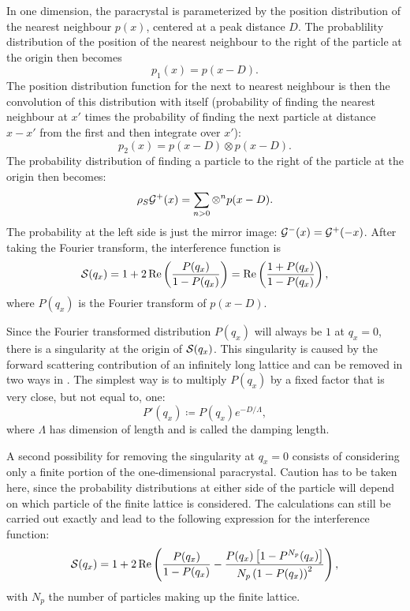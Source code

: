 In one dimension, the paracrystal is parameterized by the
position distribution of the nearest neighbour $p(x)$, centered at a peak distance $D$. The probablility
distribution of the position of the nearest neighbour to the right of the particle at the origin then becomes
\begin{equation}
  p_1(x) = p(x-D).
\end{equation}
The position distribution function for the next to nearest neighbour is then the convolution of this distribution with itself
(probability of finding the nearest neighbour at $x'$ times the probability of finding the next particle at distance $x-x'$ from the first and
then integrate over $x'$):
\begin{equation}
  p_2(x) = p(x-D) \otimes p(x-D).
\end{equation}
The probability distribution of finding a particle to the right of the particle at the origin then becomes:
\begin{equation}
  \rho_S \mathcal{G}^+(x) = \sum_{n>0} \otimes^n p(x-D).
\end{equation}
The probability at the left side is just the mirror image: $\mathcal{G}^-(x) = \mathcal{G}^+(-x)$.
After taking the Fourier transform, the interference function is
\begin{equation}
  \mathcal{S}(q_x) = 1 + 2\operatorname{Re}\left(\frac{P(q_x)}{1-P(q_x)}\right) = \operatorname{Re}\left(\frac{1+P(q_x)}{1-P(q_x)}\right),
\end{equation}
where $P(q_x)$ is the Fourier transform of $p(x-D)$.

Since the Fourier transformed distribution $P(q_x)$ will always be $1$ at $q_x=0$, there is a singularity at the origin of $\mathcal{S}(q_x)$.
This singularity is caused by the forward scattering contribution of an infinitely long lattice and can be removed in two ways in \BornAgain.
The simplest way is to multiply $P(q_x)$ by a fixed factor that is very close, but not equal to, one:
\begin{equation}
  P'(q_x) \coloneqq P(q_x) e^{-D/\Lambda},
\end{equation}
where $\Lambda$ has dimension of length and is called the damping length.

A second possibility for removing the singularity at $q_x=0$ consists of considering only a finite portion of the one-dimensional
paracrystal. Caution has to be taken here, since the probability distributions at either side of the particle will depend on which particle
of the finite lattice is considered. The calculations can still be carried out exactly and lead to the following expression for the
interference function:
\begin{equation}
   \mathcal{S}(q_x) = 1 + 2\operatorname{Re}\left( \frac{P(q_x)}{1-P(q_x)} - \frac{P(q_x)\left[1-P^{N_p}(q_x)\right]}{N_p\left( 1 - P(q_x) \right)^2} \right),
\end{equation}
with $N_p$ the number of particles making up the finite lattice.

